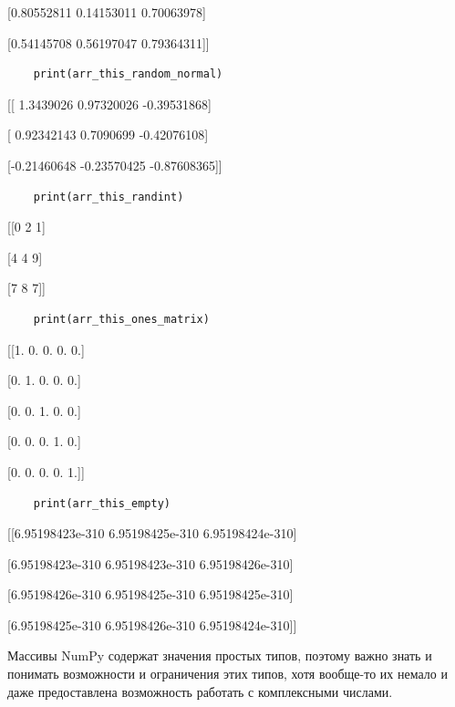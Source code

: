 \documentclass[pract]{SCWorks}
\begin{document}
\begin{itemize}
    [[0.85842966 0.19472009 0.53980876]
    
    [0.80552811 0.14153011 0.70063978]
    
    [0.54145708 0.56197047 0.79364311]]

    \begin{verbatim}
    print(arr_this_random_normal)
    \end{verbatim}

    [[ 1.3439026   0.97320026 -0.39531868]
    
    [ 0.92342143  0.7090699  -0.42076108]
    
    [-0.21460648 -0.23570425 -0.87608365]]

    \begin{verbatim}
    print(arr_this_randint)
    \end{verbatim}
    
    [[0 2 1]
    
    [4 4 9]
    
    [7 8 7]]

    \begin{verbatim}
    print(arr_this_ones_matrix)
    \end{verbatim}

    [[1. 0. 0. 0. 0.]
    
    [0. 1. 0. 0. 0.]
    
    [0. 0. 1. 0. 0.]
    
    [0. 0. 0. 1. 0.]
    
    [0. 0. 0. 0. 1.]]

    \begin{verbatim}
    print(arr_this_empty)
    \end{verbatim}

    [[6.95198423e-310 6.95198425e-310 6.95198424e-310]
    
    [6.95198423e-310 6.95198423e-310 6.95198426e-310]
    
    [6.95198426e-310 6.95198425e-310 6.95198425e-310]
    
    [6.95198425e-310 6.95198426e-310 6.95198424e-310]]

\end{itemize}

Массивы NumPy содержат значения простых типов, поэтому важно знать и понимать возможности и 
ограничения этих типов, хотя вообще-то их немало и даже предоставлена возможность работать с
комплексными числами.
\end{document}

